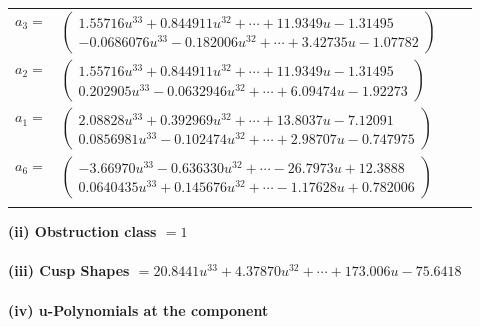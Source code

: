 \documentclass[1p]{elsarticle_modified}
\theoremstyle{definition}
\begin{document}
\begin{tabular}{m{7pt} m{180pt} m{7pt} m{180pt} }
\flushright $a_{3}=$&$\begin{pmatrix}1.55716 u^{33}+0.844911 u^{32}+\cdots+11.9349 u-1.31495\\-0.0686076 u^{33}-0.182006 u^{32}+\cdots+3.42735 u-1.07782\end{pmatrix}$ \\
\flushright $a_{2}=$&$\begin{pmatrix}1.55716 u^{33}+0.844911 u^{32}+\cdots+11.9349 u-1.31495\\0.202905 u^{33}-0.0632946 u^{32}+\cdots+6.09474 u-1.92273\end{pmatrix}$ \\
\flushright $a_{1}=$&$\begin{pmatrix}2.08828 u^{33}+0.392969 u^{32}+\cdots+13.8037 u-7.12091\\0.0856981 u^{33}-0.102474 u^{32}+\cdots+2.98707 u-0.747975\end{pmatrix}$ \\
\flushright $a_{6}=$&$\begin{pmatrix}-3.66970 u^{33}-0.636330 u^{32}+\cdots-26.7973 u+12.3888\\0.0640435 u^{33}+0.145676 u^{32}+\cdots-1.17628 u+0.782006\end{pmatrix}$\\&\end{tabular}
\flushleft \textbf{(ii) Obstruction class $= 1$}\\~\\
\flushleft \textbf{(iii) Cusp Shapes $= 20.8441 u^{33}+4.37870 u^{32}+\cdots+173.006 u-75.6418$}\\~\\
\newpage\renewcommand{\arraystretch}{1}
\flushleft \textbf{(iv) u-Polynomials at the component}\newline \\
\end{document}
